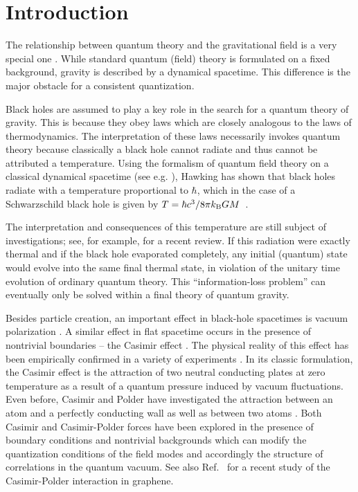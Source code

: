\documentclass[twocolumn,prd,aps,showpacs,amsmath,amssymb]{revtex4-1}
\begin{document}
\section{Introduction}
\label{intro}

The relationship between quantum theory and the gravitational field is
a very special one \cite{oup}. While standard quantum (field) theory is 
formulated on a fixed background, gravity is described by a
dynamical spacetime. This difference is the major obstacle for a
consistent quantization.  

Black holes are assumed to play a key role in the search for a quantum
theory of gravity. This is because they obey laws which are closely
analogous to the laws of thermodynamics. The interpretation of these
laws necessarily invokes quantum theory because classically a black
hole cannot radiate and thus cannot be attributed a temperature. Using
the formalism of quantum field theory on a classical dynamical
spacetime (see e.g. \cite{birrel,frolov}), Hawking has shown that black holes
radiate with a temperature proportional to $\hbar$, which in the case
of a Schwarzschild black hole is given by $T=\hbar c^3/8\pi k_{\rm
  B}GM$~\cite{hawking}. 
 
The interpretation and consequences of this temperature are still
subject of investigations; see, for example, \cite{Jerusalem} for a
recent review. If this radiation were exactly thermal and if the black
hole evaporated completely, any initial (quantum) state would evolve
into the same final thermal state, in violation of the unitary time
evolution of ordinary quantum theory. This ``information-loss
problem'' can eventually only be solved within a final theory of
quantum gravity. 

Besides particle creation, an important effect in black-hole
spacetimes is vacuum polarization \cite{frolov}. A similar effect in
flat spacetime occurs in the presence of nontrivial boundaries -- the
Casimir effect \cite{casimir,plunien,grib,bordag,book,Milonni}. The
physical reality of this effect has been empirically confirmed in a variety
of experiments \cite{L07}. 
%
In its classic formulation, the Casimir effect is the attraction of two
neutral conducting plates at zero temperature as a result
of a quantum pressure induced by vacuum fluctuations.  
%
Even before, Casimir and Polder have investigated the attraction
between an atom and a perfectly conducting wall as well as between two
atoms \cite{CP48}. 
Both Casimir and Casimir-Polder forces have been explored in the
presence of boundary conditions and nontrivial backgrounds which can
modify the quantization conditions of the field modes and accordingly
the structure of correlations in the quantum vacuum. See also Ref.~\cite{farina} 
for a recent study of the Casimir-Polder interaction in graphene.
\end{document}
